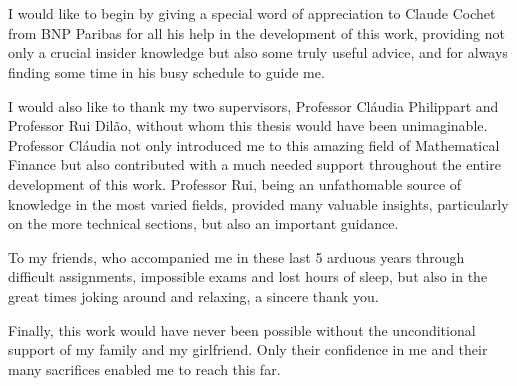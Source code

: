 
\section*{\acknowledgments}

I would like to begin by giving a special word of appreciation to Claude Cochet from BNP Paribas for all his help in the development of this work, providing not only a crucial insider knowledge but also some truly useful advice, and for always finding some time in his busy schedule to guide me.

I would also like to thank my two supervisors, Professor Cláudia Philippart and Professor Rui Dilão, without whom this thesis would have been unimaginable. Professor Cláudia not only introduced me to this amazing field of Mathematical Finance but also contributed with a much needed support throughout the entire development of this work. Professor Rui, being an unfathomable source of knowledge in the most varied fields, provided many valuable insights, particularly on the more technical sections, but also an important guidance.

To my friends, who accompanied me in these last 5 arduous years through difficult assignments, impossible exams and lost hours of sleep, but also in the great times joking around and relaxing, a sincere thank you.

Finally, this work would have never been possible without the unconditional support of my family and my girlfriend. Only their confidence in me and their many sacrifices enabled me to reach this far.

